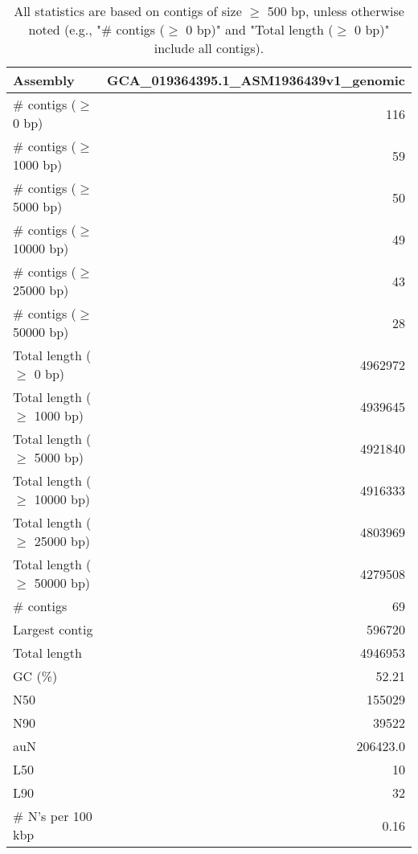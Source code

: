 \documentclass[12pt,a4paper]{article}
\begin{document}
\begin{table}[ht]
\begin{center}
\caption{All statistics are based on contigs of size $\geq$ 500 bp, unless otherwise noted (e.g., "\# contigs ($\geq$ 0 bp)" and "Total length ($\geq$ 0 bp)" include all contigs).}
\begin{tabular}{|l*{1}{|r}|}
\hline
Assembly & GCA\_019364395.1\_ASM1936439v1\_genomic \\ \hline
\# contigs ($\geq$ 0 bp) & 116 \\ \hline
\# contigs ($\geq$ 1000 bp) & 59 \\ \hline
\# contigs ($\geq$ 5000 bp) & 50 \\ \hline
\# contigs ($\geq$ 10000 bp) & 49 \\ \hline
\# contigs ($\geq$ 25000 bp) & 43 \\ \hline
\# contigs ($\geq$ 50000 bp) & 28 \\ \hline
Total length ($\geq$ 0 bp) & 4962972 \\ \hline
Total length ($\geq$ 1000 bp) & 4939645 \\ \hline
Total length ($\geq$ 5000 bp) & 4921840 \\ \hline
Total length ($\geq$ 10000 bp) & 4916333 \\ \hline
Total length ($\geq$ 25000 bp) & 4803969 \\ \hline
Total length ($\geq$ 50000 bp) & 4279508 \\ \hline
\# contigs & 69 \\ \hline
Largest contig & 596720 \\ \hline
Total length & 4946953 \\ \hline
GC (\%) & 52.21 \\ \hline
N50 & 155029 \\ \hline
N90 & 39522 \\ \hline
auN & 206423.0 \\ \hline
L50 & 10 \\ \hline
L90 & 32 \\ \hline
\# N's per 100 kbp & 0.16 \\ \hline
\end{tabular}
\end{center}
\end{table}
\end{document}
